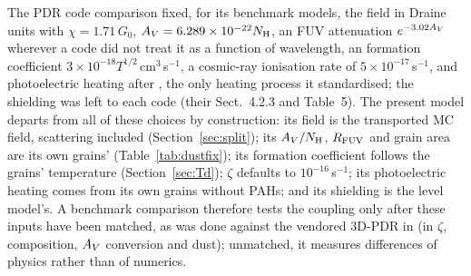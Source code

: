 The PDR code comparison \citep{Rollig2007} fixed, for its benchmark models,
the field in Draine units with $\chi=1.71\,G_0$, $A_{V}=6.289\times10^{-22}N_{\mathrm H}$,
an FUV attenuation $e^{-3.02A_{V}}$ wherever a code did not treat it as a
function of wavelength, an \Htwo{} formation coefficient
$3\times10^{-18}T^{1/2}$\,cm$^3$\,s$^{-1}$, a cosmic-ray ionisation rate of
$5\times10^{-17}$\,s$^{-1}$, and photoelectric heating after
\citet{BakesTielens1994}, the only heating process it standardised; the
\Htwo{} shielding was left to each code (their Sect.~4.2.3 and Table~5). The
present model departs from all of these choices by construction: its field is
the transported MC field, scattering included (Section~\ref{sec:split}); its
$A_{V}/N_{\mathrm H}$, $R_{\mathrm{FUV}}$ and grain area are its own grains'
(Table~\ref{tab:dustfix}); its formation coefficient follows the grains'
temperature (Section~\ref{sec:Td}); $\zeta$ defaults to $10^{-16}$\,s$^{-1}$; its
photoelectric heating comes from its own grains without PAHs; and its \Htwo{}
shielding is the level model's. A benchmark comparison therefore tests the
coupling only after these inputs have been matched, as was done against the
vendored 3D-PDR in  (in $\zeta$, composition, $A_{V}$ conversion and
dust); unmatched, it measures differences of physics rather than of numerics.
